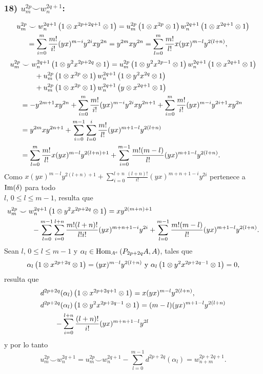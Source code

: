 \documentclass[fleqn,../tesis.tex]{subfiles}
\begin{document}
\subsubsection{18) $u_m^{2p} \smile w_n^{2q + 1}$:}
\begin{align*}
	u_m^{2p} & \smile w_n^{2q + 1}\left(1\otimes x^{2p + 2q + 1} \otimes 1\right)
		= u_m^{2p}\left(1\otimes x^{2p}\otimes 1\right)w_n^{2q + 1}\left(1\otimes x^{2q + 1}\otimes 1\right)\\
	&= \sum_{i = 0}^{m}\frac{m!}{i!}(yx)^{m - i}y^{2i}xy^{2n} = y^{2m}xy^{2n}
		= \sum_{l = 0}^{m}\frac{m!}{l!}x(yx)^{m - l}y^{2(l + n)},
\end{align*}
\begin{align*}
	u_m^{2p} & \smile w_n^{2q + 1}\left(1\otimes y^2x^{2p + 2q} \otimes 1\right)
		= u_m^{2p}\left(1\otimes y^2x^{2p - 1}\otimes 1\right)w_n^{2q + 1}\left(1\otimes x^{2q + 1}\otimes 1\right)\\
	&\qquad + u_m^{2p}\left(1 \otimes x^{2p} \otimes 1\right)w_n^{2q + 1}\left(1\otimes y^2x^{2q}\otimes 1\right)\\
	&\qquad + u_m^{2p}\left(1 \otimes x^{2p} \otimes 1\right)w_n^{2q + 1}\left(y\otimes x^{2q +1}\otimes 1\right)\\
	&= -y^{2m + 1}xy^{2n} + \sum_{i = 0}^{m}\frac{m!}{i!}(yx)^{m - i}y^{2i}xy^{2n + 1}
		+ \sum_{i = 0}^{m}\frac{m!}{i!}(yx)^{m - i}y^{2i + 1}xy^{2n}\\
	&= y^{2m}xy^{2n + 1}
		+ \sum_{i = 0}^{m - 1}\sum_{l =0}^{i}\frac{m!}{l!}(yx)^{m + 1 - l}y^{2(l + n)}\\
	&= \sum_{l = 0}^{m}\frac{m!}{l!}x(yx)^{m - l}y^{2(l + n) + 1}
		+ \sum_{i = 0}^{m - 1}\frac{m!(m - l)}{l!}(yx)^{m + 1 - l}y^{2(l + n)}.
\end{align*}
Como $x(yx)^{m - l}y^{2(l + n) + 1}
	+ \sum_{i = 0}^{l + n}\frac{(l + n)!}{i!}(yx)^{m + n + 1 -i}y^{2i}$ pertenece a $\operatorname{Im}(\delta)$
	para todo \\ $l$, $0 \leq l \leq m - 1$, resulta que
\begin{align*}
	u_m^{2p} & \smile w_n^{2q + 1}\left(1\otimes y^2x^{2p + 2q} \otimes 1\right) = xy^{2(m + n) + 1}\\
		&\qquad - \sum_{l = 0}^{m - 1}\sum_{i = 0}^{l + n}\frac{m!(l + n)!}{l!i!}(yx)^{m + n + 1 -i}y^{2i}
		+\sum_{l = 0}^{m - 1}\frac{m!(m - l)}{l!}(yx)^{m + 1 - l}y^{2(l + n)}.
\end{align*}
Sean $l$, $0\leq l \leq m - 1$ y $\alpha_l \in \operatorname{Hom}_{A^{e}}\left(P_{2p + 2q}A, A\right)$, tales que
\[
	\alpha_l\left(1 \otimes x^{2p + 2q} \otimes 1\right) = (yx)^{m -l}y^{2(l + n)} \text{ y }
		\alpha_l\left(1 \otimes y^2x^{2p + 2q - 1} \otimes 1\right) = 0,
\]
resulta que
\begin{align*}
	&d^{2p + 2q}(\alpha_l)\left(1 \otimes x^{2p + 2q + 1} \otimes 1\right) = x(yx)^{m - l}y^{2(l + n)},\\
	&d^{2p + 2q}(\alpha_l)\left(1 \otimes y^2x^{2p + 2q - 1} \otimes 1\right)
		=(m - l)(yx)^{m  + 1 - l}y^{2(l + n)}\\
	&\qquad- \sum_{i = 0}^{l + n}\frac{(l + n)!}{i!}(yx)^{m + n  +1 -l}y^{2l}
\end{align*}
y por lo tanto
\[
	u_m^{2p}  \smile w_n^{2q + 1} = u_m^{2p}  \smile w_n^{2q + 1}
		- \sum_{l = 0}^{m - 1}d^{2p + 2q}(\alpha_l) = w_{n + m}^{2p + 2q + 1}.
\]
\end{document}
